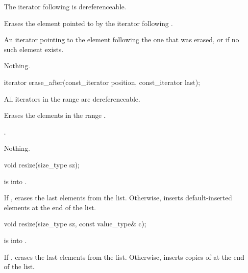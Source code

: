 \begin{itemdescr}
\pnum
\expects
The iterator following  is dereferenceable.

\pnum
\effects
Erases the element pointed to by the iterator following .

\pnum
\returns
An iterator pointing to the element following the one that was
erased, or  if no such element exists.

\pnum
\throws
Nothing.
\end{itemdescr}

\begin{itemdecl}
iterator erase_after(const_iterator position, const_iterator last);
\end{itemdecl}

\begin{itemdescr}
\pnum
\expects
All iterators in the range  are dereferenceable.

\pnum
\effects
Erases the elements in the range .

\pnum
\returns
{}.

\pnum
\throws
Nothing.
\end{itemdescr}

%
\begin{itemdecl}
void resize(size_type sz);
\end{itemdecl}

\begin{itemdescr}
\pnum
\expects
{} is  into .

\pnum
\effects
If , erases the last  elements from the list. Otherwise, inserts  default-inserted
elements at the end of the list.
\end{itemdescr}

\begin{itemdecl}
void resize(size_type sz, const value_type& c);
\end{itemdecl}

\begin{itemdescr}
\pnum
\expects
{} is  into .

\pnum
\effects
If , erases the last  elements from the list. Otherwise, inserts 
copies of  at the end of the list.
\end{itemdescr}


